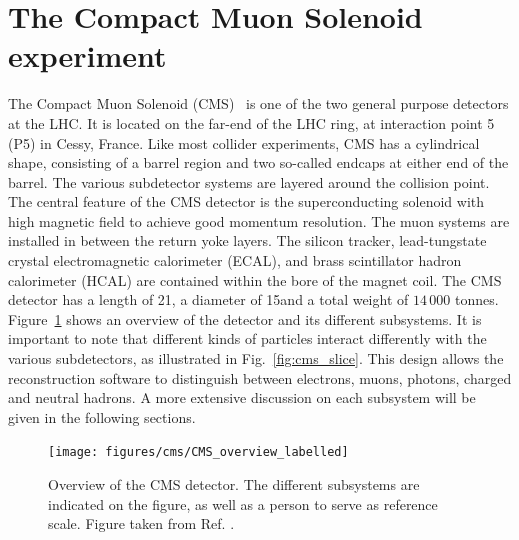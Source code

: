 \section{The Compact Muon Solenoid experiment \label{chap:CMS}}

The Compact Muon Solenoid (CMS)~\cite{Chatrchyan:2008aa,Bayatian:922757,Ball:2007zza,CMS_website} is
one of the two general purpose detectors
at the LHC. It is
located on the far-end of the LHC ring, at interaction point 5 (P5) in Cessy, France. 
Like most collider experiments, CMS has a cylindrical shape, consisting of a barrel region and two
so-called endcaps at either end of the barrel. The various subdetector systems are layered around
the collision point. The central feature of the CMS detector is the superconducting solenoid with
high magnetic field to achieve good momentum resolution. The muon systems are installed in between
the return yoke layers. The silicon tracker, lead-tungstate crystal electromagnetic calorimeter
(ECAL), and brass scintillator hadron calorimeter (HCAL) are contained within the bore of the magnet
coil. 
The CMS detector has a length of 21\meter, a diameter of 15\meter and a total weight of $14\,000$
tonnes. 
Figure~\ref{fig:cms_overview} shows an overview of the detector and its different
subsystems. It is important to note that different kinds of particles interact differently with the
various subdetectors, as illustrated in Fig.~\ref{fig:cms_slice}. This design allows the
reconstruction software to distinguish between electrons, muons, photons, charged and neutral
hadrons. 
A more extensive discussion on each subsystem will be given in the
following sections. 

\begin{figure}[htpb]
  \centering
  \texttt{[image: figures/cms/CMS\_overview\_labelled]}
  \caption{Overview of the CMS detector. The different subsystems are indicated on the figure, as
well as a person to serve as reference scale. Figure taken from Ref. \cite{CMS_overview_labelled}.
  \label{fig:cms_overview}}
\end{figure}

